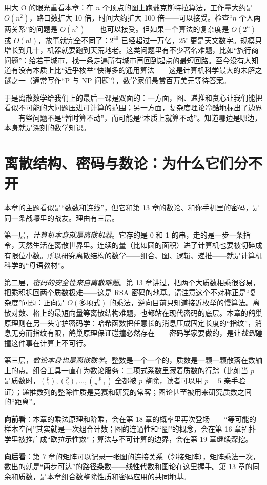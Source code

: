 用大 O 的眼光重看本章：在 $n$ 个顶点的图上跑戴克斯特拉算法，工作量大约是 $O(n^2)$，路口数扩大 10 倍，时间大约扩大 100 倍——可以接受。检查“$n$ 个人两两关系”的问题是 $O(n^2)$——也可以接受。但如果一个算法的复杂度是 $O(2^n)$ 或 $O(n!)$，故事就完全不同了：$2^{40}$ 已经超过一万亿，$25!$ 更是天文数字。规模只增长到几十，机器就要跑到天荒地老。这类问题里有不少著名难题，比如“旅行商问题”：给若干城市，找一条走遍所有城市再回到起点的最短回路。至今没有人知道有没有本质上比“近乎枚举”快得多的通用算法——这是计算机科学最大的未解之谜之一（通常写作“P 与 NP 问题”），数学家们悬赏百万美元等待答案。

于是离散数学给我们上的最后一课是双面的：一方面，图、递推和贪心让我们能把看似不可能的大问题压进可计算的范围；另一方面，复杂度理论冷酷地标出了边界——有些问题不是“暂时算不动”，而可能是“本质上就算不动”。知道哪边是哪边，本身就是深刻的数学知识。

\section{离散结构、密码与数论：为什么它们分不开}

本章的主题看似是“数数和连线”，但它和第 13 章的数论、和你手机里的密码，是同一条战壕里的战友。理由有三层。

第一层，\emph{计算机本身就是离散机器}。它存的是 0 和 1 的串，走的是一步一条指令，天然生活在离散世界里。连续的量（比如圆的面积）进了计算机也要被切碎成有限位小数。所以研究离散结构的数学——组合、图、逻辑、递推——就是计算机科学的“母语教材”。

第二层，\emph{密码的安全性来自离散难题}。第 13 章讲过，把两个大质数相乘很容易，把乘积拆回两个质数极难——这是 RSA 密码的地基。请注意这个不对称正是“复杂度”问题：正向是 $O(\text{多项式})$ 的乘法，逆向目前只知道接近枚举的慢算法。离散对数、格上的最短向量等离散结构难题，也都站在现代密码的底层。本章的鸽巢原理则在另一头守护密码学：哈希函数把任意长的消息压成固定长度的“指纹”，消息无穷而指纹有限，鸽巢原理保证碰撞必然存在——密码学家要做的，是让\emph{找到}碰撞这件事在计算上不可行。

第三层，\emph{数论本身也是离散数学}。整数是一个一个的，质数是一颗一颗散落在数轴上的点。组合工具一直在为数论服务：二项式系数里藏着质数的行踪（比如当 $p$ 是质数时，$\binom{p}{1},\binom{p}{2},\dots,\binom{p}{p-1}$ 全都被 $p$ 整除，读者可以用 $p=5$ 亲手验证）；递推数列的整除性质是竞赛和研究的常客；图论甚至被用来研究质数之间的“距离”。

\begin{lianjie}
\textbf{向前看}：本章的乘法原理和阶乘，会在第 18 章的概率里再次登场——“等可能的样本空间”其实就是一次组合计数；图的连通性和“圈”的概念，会在第 16 章拓扑学里被推广成“欧拉示性数”；算法与不可计算的边界，会在第 19 章继续深挖。

\textbf{向后看}：第 7 章的矩阵可以记录一张图的连接关系（邻接矩阵），矩阵乘法一次，数出的就是“两步可达”的路径条数——线性代数和图论在这里握手。第 13 章的同余和质数，是本章组合数整除性质和密码应用的共同地基。
\end{lianjie}

